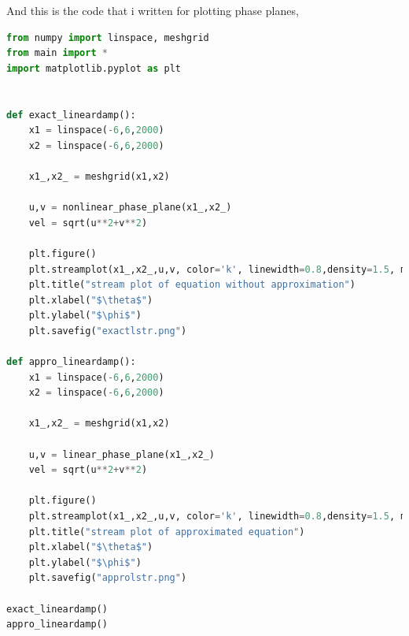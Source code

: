 \documentclass[11pt,a4paper]{article}
\begin{document}
And this is the code that i written for plotting phase planes,
\begin{lstlisting}[language=Python]
    from numpy import linspace, meshgrid
from main import *
import matplotlib.pyplot as plt


def exact_lineardamp():
    x1 = linspace(-6,6,2000)
    x2 = linspace(-6,6,2000)

    x1_,x2_ = meshgrid(x1,x2)

    u,v = nonlinear_phase_plane(x1_,x2_)
    vel = sqrt(u**2+v**2)

    plt.figure()
    plt.streamplot(x1_,x2_,u,v, color='k', linewidth=0.8,density=1.5, minlength=0.01, arrowsize=0.8,arrowstyle="->")
    plt.title("stream plot of equation without approximation")
    plt.xlabel("$\theta$")
    plt.ylabel("$\phi$")
    plt.savefig("exactlstr.png")

def appro_lineardamp():
    x1 = linspace(-6,6,2000)
    x2 = linspace(-6,6,2000)

    x1_,x2_ = meshgrid(x1,x2)

    u,v = linear_phase_plane(x1_,x2_)
    vel = sqrt(u**2+v**2)

    plt.figure()
    plt.streamplot(x1_,x2_,u,v, color='k', linewidth=0.8,density=1.5, minlength=0.01, arrowsize=0.8,arrowstyle="->")
    plt.title("stream plot of approximated equation")
    plt.xlabel("$\theta$")
    plt.ylabel("$\phi$")
    plt.savefig("approlstr.png")

exact_lineardamp()
appro_lineardamp()

  \end{lstlisting}






\end{document}
